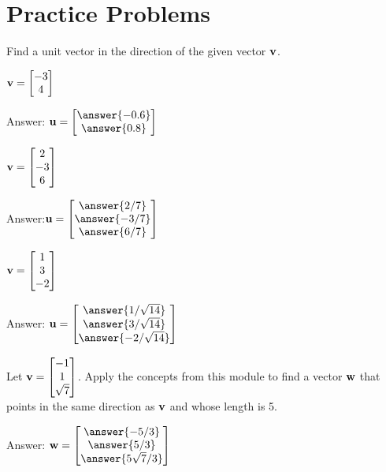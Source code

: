 \documentclass{ximera}
\begin{document}
\section*{Practice Problems}
\begin{problem}
    Find a unit vector in the direction of the given vector ${\bf v}$.
  \begin{problem}
  ${\bf v}=\begin{bmatrix}-3\\4\end{bmatrix}$

  Answer: $\vec{u}=\begin{bmatrix}\answer{-0.6}\\\answer{0.8}\end{bmatrix}$
  \end{problem}
  \begin{problem}
      ${\bf v}=\begin{bmatrix}2\\-3\\6\end{bmatrix}$

Answer:$\vec{u}=\begin{bmatrix}\answer{2/7}\\\answer{-3/7}\\\answer{6/7}\end{bmatrix}$
   \end{problem}
   \begin{problem}
        ${\bf v}=\begin{bmatrix}1\\3\\-2\end{bmatrix}$

 Answer: $\vec{u}=\begin{bmatrix}\answer{1/\sqrt{14}}\\\answer{3/\sqrt{14}}\\\answer{-2/\sqrt{14}}\end{bmatrix}$       
  \end{problem}
\end{problem}  
\begin{problem}
Let ${\bf v}=\begin{bmatrix}-1\\1\\\sqrt{7}\end{bmatrix}$.
Apply the concepts from this module to find a vector ${\bf w}$ that points in the same direction as ${\bf v}$ and whose length is 5.

Answer: ${\bf w}=\begin{bmatrix}
    \answer{-5/3}\\\answer{5/3}\\\answer{5\sqrt{7}/3}
\end{bmatrix}$
\end{problem}
\end{document}
